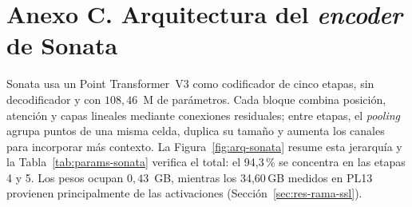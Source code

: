 
\section*{Anexo C. Arquitectura del \emph{encoder} de Sonata}
\label{sec:analisis-componentes}\label{sec:arq-sonata}

\setcounter{figure}{0}
\setcounter{table}{0}
\setcounter{equation}{0}

Sonata usa un Point Transformer~V3 como codificador de cinco etapas, sin
decodificador y con $108{,}46$~M de parámetros. Cada bloque combina posición,
atención y capas lineales mediante conexiones residuales; entre etapas, el
\emph{pooling} agrupa puntos de una misma celda, duplica su tamaño y aumenta los
canales para incorporar más contexto. La Figura~\ref{fig:arq-sonata} resume esta
jerarquía y la Tabla~\ref{tab:params-sonata} verifica el total: el 94{,}3\,\% se
concentra en las etapas 4 y 5. Los pesos ocupan $0{,}43$~GB, mientras los
34{,}60\,GB medidos en PL13 provienen principalmente de las activaciones
(Sección~\ref{sec:res-rama-ssl}).

